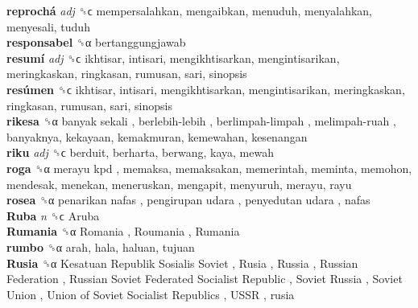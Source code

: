\textbf{reprochá} \emph{adj}  ␝ϲ  mempersalahkan, mengaibkan, menuduh, menyalahkan, menyesali, tuduh  \\
\textbf{responsabel} ␝α  bertanggungjawab  \\
\textbf{resumí} \emph{adj}  ␝ϲ  ikhtisar, intisari, mengikhtisarkan, mengintisarikan, meringkaskan, ringkasan, rumusan, sari, sinopsis  \\
\textbf{resúmen} ␝ϲ  ikhtisar, intisari, mengikhtisarkan, mengintisarikan, meringkaskan, ringkasan, rumusan, sari, sinopsis  \\
\textbf{rikesa} ␝α   banyak sekali ,  berlebih-lebih ,  berlimpah-limpah ,  melimpah-ruah , banyaknya, kekayaan, kemakmuran, kemewahan, kesenangan  \\
\textbf{riku} \emph{adj}  ␝ϲ  berduit, berharta, berwang, kaya, mewah  \\
\textbf{roga} ␝α   merayu kpd , memaksa, memaksakan, memerintah, meminta, memohon, mendesak, menekan, meneruskan, mengapit, menyuruh, merayu, rayu  \\
\textbf{rosea} ␝α   penarikan nafas ,  pengirupan udara ,  penyedutan udara , nafas  \\
\textbf{Ruba} \emph{n}  ␝ϲ   Aruba   \\
\textbf{Rumania} ␝α   Romania ,  Roumania ,  Rumania   \\
\textbf{rumbo} ␝α  arah, hala, haluan, tujuan  \\
\textbf{Rusia} ␝α   Kesatuan Republik Sosialis Soviet ,  Rusia ,  Russia ,  Russian Federation ,  Russian Soviet Federated Socialist Republic ,  Soviet Russia ,  Soviet Union ,  Union of Soviet Socialist Republics ,  USSR , rusia  \\
